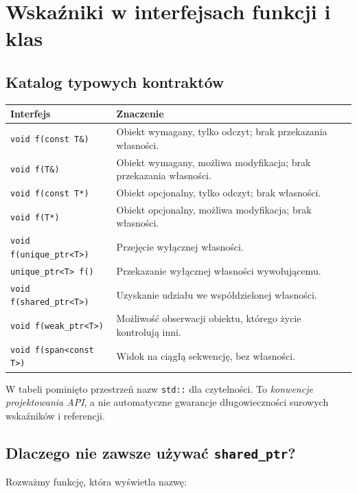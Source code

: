 \section{Wskaźniki w interfejsach funkcji i klas}

\subsection{Katalog typowych kontraktów}

\begin{center}
\small
\begin{tabular}{|p{}|p{}|}
\hline
\textbf{Interfejs} & \textbf{Znaczenie} \\
\hline
\texttt{void f(const T\&)} & Obiekt wymagany, tylko odczyt; brak przekazania własności. \\
\hline
\texttt{void f(T\&)} & Obiekt wymagany, możliwa modyfikacja; brak przekazania własności. \\
\hline
\texttt{void f(const T*)} & Obiekt opcjonalny, tylko odczyt; brak własności. \\
\hline
\texttt{void f(T*)} & Obiekt opcjonalny, możliwa modyfikacja; brak własności. \\
\hline
\texttt{void f(unique\_ptr<T>)} & Przejęcie wyłącznej własności. \\
\hline
\texttt{unique\_ptr<T> f()} & Przekazanie wyłącznej własności wywołującemu. \\
\hline
\texttt{void f(shared\_ptr<T>)} & Uzyskanie udziału we współdzielonej własności. \\
\hline
\texttt{void f(weak\_ptr<T>)} & Możliwość obserwacji obiektu, którego życie kontrolują inni. \\
\hline
\texttt{void f(span<const T>)} & Widok na ciągłą sekwencję, bez własności. \\
\hline
\end{tabular}
\end{center}

W tabeli pominięto przestrzeń nazw \texttt{std::} dla czytelności.
To \emph{konwencje projektowania API}, a nie automatyczne
gwarancje długowieczności surowych wskaźników i referencji.

\subsection{Dlaczego nie zawsze używać \texttt{shared\_ptr}?}

Rozważmy funkcję, która wyświetla nazwę:

